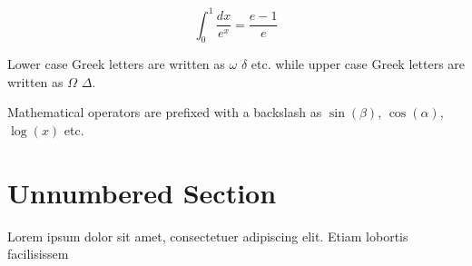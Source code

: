 \documentclass[12pt, a4paper]{report}
\begin{document}
\[ \int_0^1 \frac{dx}{e^x} =  \frac{e-1}{e} \]

Lower case Greek letters are written as $\omega$ $\delta$ etc. while upper case Greek letters are written as $\Omega$ $\Delta$.

Mathematical operators are prefixed with a backslash as $\sin(\beta)$, $\cos(\alpha)$, $\log(x)$ etc.

\section*{Unnumbered Section}
Lorem ipsum dolor sit amet, consectetuer adipiscing elit. Etiam lobortis facilisissem
\end{document}
